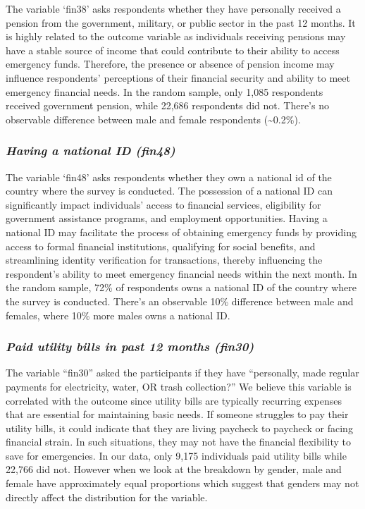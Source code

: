 \documentclass[12pt]{article}
\begin{document}
The variable `fin38' asks respondents whether they have personally
received a pension from the government, military, or public sector in
the past 12 months. It is highly related to the outcome variable as
individuals receiving pensions may have a stable source of income that
could contribute to their ability to access emergency funds. Therefore,
the presence or absence of pension income may influence respondents'
perceptions of their financial security and ability to meet emergency
financial needs. In the random sample, only 1,085 respondents received
government pension, while 22,686 respondents did not. There's no
observable difference between male and female respondents
(\textasciitilde0.2\%).

\hypertarget{having-a-national-id-fin48}{%
\subsubsection{\texorpdfstring{\emph{Having a national ID
(fin48)}}{Having a national ID (fin48)}}\label{having-a-national-id-fin48}}

The variable `fin48' asks respondents whether they own a national id of
the country where the survey is conducted. The possession of a national
ID can significantly impact individuals' access to financial services,
eligibility for government assistance programs, and employment
opportunities. Having a national ID may facilitate the process of
obtaining emergency funds by providing access to formal financial
institutions, qualifying for social benefits, and streamlining identity
verification for transactions, thereby influencing the respondent's
ability to meet emergency financial needs within the next month. In the
random sample, 72\% of respondents owns a national ID of the country
where the survey is conducted. There's an observable 10\% difference
between male and females, where 10\% more males owns a national ID.

\hypertarget{paid-utility-bills-in-past-12-months-fin30}{%
\subsubsection{\texorpdfstring{\emph{Paid utility bills in past 12
months
(fin30)}}{Paid utility bills in past 12 months (fin30)}}\label{paid-utility-bills-in-past-12-months-fin30}}

The variable ``fin30'' asked the participants if they have ``personally,
made regular payments for electricity, water, OR trash collection?'' We
believe this variable is correlated with the outcome since utility bills
are typically recurring expenses that are essential for maintaining
basic needs. If someone struggles to pay their utility bills, it could
indicate that they are living paycheck to paycheck or facing financial
strain. In such situations, they may not have the financial flexibility
to save for emergencies. In our data, only 9,175 individuals paid
utility bills while 22,766 did not. However when we look at the
breakdown by gender, male and female have approximately equal
proportions which suggest that genders may not directly affect the
distribution for the variable.
\end{document}
